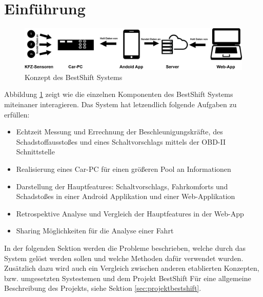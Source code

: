 \section{Einführung}
\label{sec:intro}

\begin{figure}[!htb]
	\centering
	\includegraphics[scale=0.6]{images/konzept}
	\caption{Konzept des BestShift Systems}
	\label{fig:konzept1}
\end{figure}

Abbildung \ref{fig:konzept1} zeigt wie die einzelnen Komponenten des BestShift Systems miteinaner interagieren. Das System hat letzendlich folgende Aufgaben zu erfüllen:

\begin{itemize}
	\item Echtzeit Messung und Errechnung der Beschleunigungskräfte, des Schadstoffausstoßes und eines Schaltvorschlags mittels der OBD-II Schnittstelle
	\item Realisierung eines Car-PC für einen größeren Pool an Informationen
	\item Darstellung der Hauptfeatures: Schaltvorschlags, Fahrkomforts und Schadstoßes in einer Android Applikation und einer Web-Applikation
	\item Retrospektive Analyse und Vergleich der Hauptfeatures in der Web-App
	\item Sharing Möglichkeiten für die Analyse einer Fahrt
\end{itemize}

In der folgenden Sektion werden die Probleme beschrieben, welche durch das System gelöst werden sollen und welche Methoden dafür verwendet wurden. Zusätzlich dazu wird auch ein Vergleich zwischen anderen etablierten Konzepten, bzw. umgesetzten Systestemen und dem Projekt BestShift Für eine allgemeine Beschreibung des Projekts, siehe Sektion \ref{sec:projektbestshift}.



